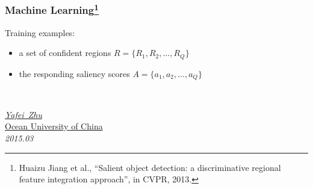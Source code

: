 \documentclass[notheorems,serif,table,compress]{beamer}  %
\newcommand\zhushadow[2][purple]{\hskip5pt\shadowbox{\color{#1}\small\kai #2\vspace{3mm}}}
\begin{document}
\begin{frame}
\frametitle{{\color{magenta}} Machine Learning\footnote{Huaizu Jiang et al., ``Salient object detection: a discriminative regional feature integration approach'', in CVPR, 2013.}}
Training examples: 
\begin{itemize}
\item a set of confident regions $R = \{ R_1, R_2, \ldots, R_Q\}$
\item the responding saliency scores $A = \{a_1, a_2, \ldots, a_Q\}$
\end{itemize}
\end{frame}


\begin{frame}
  \vspace{2cm}
  \centering
  \zhushadow{\color{blue}\Huge{Thanks}}\\
  \vspace{1.5cm}
  \begin{flushright}
  \emph{\href{zhuyafei4520@163.com}{Yafei~Zhu}}\\
  \href{http://www.ouc.edu.cn}{Ocean University of China}\\
  \emph{2015.03}
  \end{flushright}  
\end{frame}

\end{document}
